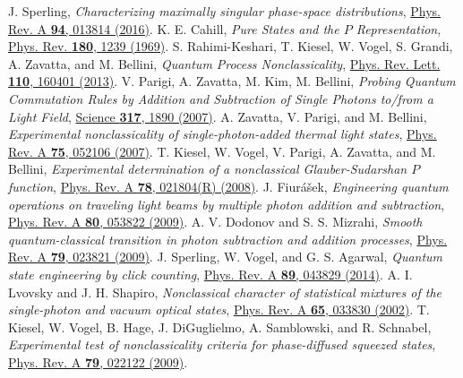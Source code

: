 \documentclass[aps,pra,twocolumn,showpacs,superscriptaddress,10pt]{revtex4-1}
\begin{document}
\begin{thebibliography}{100}
	 J. Sperling, {\it Characterizing maximally singular phase-space distributions}, \href{http://link.aps.org/doi/10.1103/PhysRevA.94.013814}{Phys. Rev. A {\bf 94}, 013814 (2016)}.
	 K. E. Cahill, {\it Pure States and the $P$ Representation}, \href{http://link.aps.org/doi/10.1103/PhysRev.180.1239}{Phys. Rev. {\bf 180}, 1239 (1969)}.
	 S. Rahimi-Keshari, T. Kiesel, W. Vogel, S. Grandi, A. Zavatta, and M. Bellini, {\it Quantum Process Nonclassicality}, \href{http://link.aps.org/doi/10.1103/PhysRevLett.110.160401}{Phys. Rev. Lett. {\bf 110}, 160401 (2013)}.
% 	
	 V. Parigi, A. Zavatta, M. Kim, M. Bellini, {\it Probing Quantum Commutation Rules by Addition and Subtraction of Single Photons to/from a Light Field}, \href{http://science.sciencemag.org/content/317/5846/1890}{Science {\bf 317}, 1890 (2007)}.
	 A. Zavatta, V. Parigi, and M. Bellini, {\it Experimental nonclassicality of single-photon-added thermal light states}, \href{http://link.aps.org/doi/10.1103/PhysRevA.75.052106}{Phys. Rev. A {\bf 75}, 052106 (2007)}.
	 T. Kiesel, W. Vogel, V. Parigi, A. Zavatta, and M. Bellini, {\it Experimental determination of a nonclassical Glauber-Sudarshan $P$ function}, \href{http://link.aps.org/doi/10.1103/PhysRevA.78.021804}{Phys. Rev. A {\bf 78}, 021804(R) (2008)}.
	 J. Fiur\'a\v{s}ek, {\it Engineering quantum operations on traveling light beams by multiple photon addition and subtraction}, \href{http://link.aps.org/doi/10.1103/PhysRevA.80.053822}{Phys. Rev. A {\bf 80}, 053822 (2009)}.
	 A. V. Dodonov and S. S. Mizrahi, {\it Smooth quantum-classical transition in photon subtraction and addition processes}, \href{http://link.aps.org/doi/10.1103/PhysRevA.79.023821}{Phys. Rev. A {\bf 79}, 023821 (2009)}.
%
 	 J. Sperling, W. Vogel, and G. S. Agarwal, {\it Quantum state engineering by click counting}, \href{http://link.aps.org/doi/10.1103/PhysRevA.89.043829}{Phys. Rev. A {\bf 89}, 043829 (2014)}.
	 A. I. Lvovsky and J. H. Shapiro, {\it Nonclassical character of statistical mixtures of the single-photon and vacuum optical states}, \href{http://link.aps.org/doi/10.1103/PhysRevA.65.033830}{Phys. Rev. A {\bf 65}, 033830 (2002)}.
	 T. Kiesel, W. Vogel, B. Hage, J. DiGuglielmo, A. Samblowski, and R. Schnabel, {\it Experimental test of nonclassicality criteria for phase-diffused squeezed states}, \href{http://link.aps.org/doi/10.1103/PhysRevA.79.022122}{Phys. Rev. A {\bf 79}, 022122 (2009)}.

\end{thebibliography}
\end{document}
